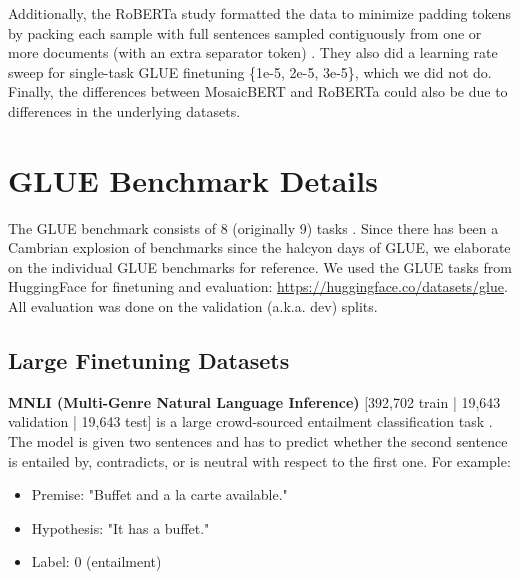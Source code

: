 Additionally, the RoBERTa study formatted the data to minimize padding tokens by packing each sample with full sentences sampled contiguously from one or more documents (with an extra separator token) \cite{liu2019roberta}. They also did a learning rate sweep for single-task GLUE finetuning \{1e-5, 2e-5, 3e-5\}, which we did not do. Finally, the differences between MosaicBERT and RoBERTa could also be due to differences in the underlying datasets.











\section{GLUE Benchmark Details}
\label{sec:glue-details}

The GLUE benchmark consists of 8 (originally 9) tasks \citep{wang2018glue}.
Since there has been a Cambrian explosion of benchmarks since the halcyon days of GLUE, we elaborate on the individual GLUE benchmarks for reference. We used the GLUE tasks from HuggingFace for finetuning and evaluation: \href{https://huggingface.co/datasets/glue}{\url{https://huggingface.co/datasets/glue}}. All evaluation was done on the validation (a.k.a. dev) splits.

\subsection{Large Finetuning Datasets}

\textbf{MNLI (Multi-Genre  Natural  Language  Inference) }[392,702 train | 19,643 validation | 19,643 test]  is a large crowd-sourced entailment classification task \citep{williams2017broad}.  The model is given two sentences and has to predict whether the second sentence is entailed by, contradicts, or is neutral with respect to the first one. For example:
\begin{itemize}
    \item Premise: "Buffet and a  la carte available."
    \item Hypothesis: "It has a buffet."
    \item Label: 0 (entailment)
\end{itemize}


